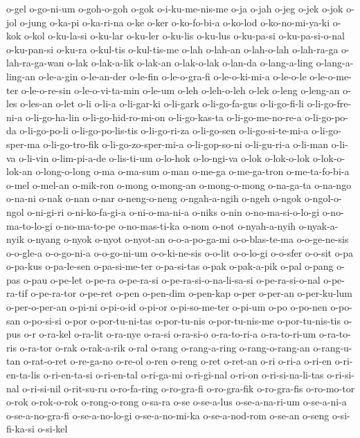 {o-gel o-go-ni-um o-goh-o-goh o-gok o-i-ku-me-nis-me o-ja o-jah o-jeg o-jek
o-jok o-jol o-jung o-ka-pi o-ka-ri-na o-ke o-ker o-ko-fo-bi-a o-ko-lod
o-ko-no-mi-ya-ki o-kok o-kol o-ku-la-si o-ku-lar o-ku-ler o-ku-lis
o-ku-lus o-ku-pa-si o-ku-pa-si-o-nal o-ku-pan-si o-ku-ra o-kul-tis
o-kul-tis-me o-lah o-lah-an o-lah-o-lah o-lah-ra-ga o-lah-ra-ga-wan o-lak
o-lak-a-lik o-lak-an o-lak-o-lak o-lan-da o-lang-a-ling o-lang-a-ling-an
o-le-a-gin o-le-an-der o-le-fin o-le-o-gra-fi o-le-o-ki-mi-a o-le-o-le
o-le-o-me-ter o-le-o-re-sin o-le-o-vi-ta-min o-le-um o-leh o-leh-o-leh
o-lek o-leng o-leng-an o-les o-les-an o-let o-li o-li-a o-li-gar-ki
o-li-gark o-li-go-fa-gus o-li-go-fi-li o-li-go-fre-ni-a o-li-go-ha-lin
o-li-go-hid-ro-mi-on o-li-go-kas-ta o-li-go-me-no-re-a o-li-go-po-da
o-li-go-po-li o-li-go-po-lis-tis o-li-go-ri-za o-li-go-sen
o-li-go-si-te-mi-a o-li-go-sper-ma o-li-go-tro-fik o-li-go-zo-sper-mi-a
o-li-gop-so-ni o-li-gu-ri-a o-li-man o-li-va o-li-vin o-lim-pi-a-de
o-lis-ti-um o-lo-hok o-lo-ngi-va o-lok o-lok-o-lok o-lok-o-lok-an
o-long-o-long o-ma o-ma-sum o-man o-me-ga o-me-ga-tron o-me-ta-fo-bi-a
o-mel o-mel-an o-mik-ron o-mong o-mong-an o-mong-o-mong o-na-ga-ta
o-na-ngo o-na-ni o-nak o-nan o-nar o-neng-o-neng o-ngah-a-ngih o-ngeh
o-ngok o-ngol-o-ngol o-ni-gi-ri o-ni-ko-fa-gi-a o-ni-o-ma-ni-a o-niks
o-nin o-no-ma-si-o-lo-gi o-no-ma-to-lo-gi o-no-ma-to-pe o-no-mas-ti-ka
o-nom o-not o-nyah-a-nyih o-nyak-a-nyik o-nyang o-nyok o-nyot o-nyot-an
o-o-a-po-ga-mi o-o-blas-te-ma o-o-ge-ne-sis o-o-gle-a o-o-go-ni-a
o-o-go-ni-um o-o-ki-ne-sis o-o-lit o-o-lo-gi o-o-sfer o-o-sit o-pa
o-pa-kus o-pa-le-sen o-pa-si-me-ter o-pa-si-tas o-pak o-pak-a-pik o-pal
o-pang o-pas o-pau o-pe-let o-pe-ra o-pe-ra-si o-pe-ra-si-o-na-li-sa-si
o-pe-ra-si-o-nal o-pe-ra-tif o-pe-ra-tor o-pe-ret o-pen o-pen-dim
o-pen-kap o-per o-per-an o-per-ku-lum o-per-o-per-an o-pi-ni o-pi-o-id
o-pi-or o-pi-so-me-ter o-pi-um o-po o-po-nen o-po-san o-po-si-si o-por
o-por-tu-ni-tas o-por-tu-nis o-por-tu-nis-me o-por-tu-nis-tis o-pus o-r
o-ra-kel o-ra-lit o-ra-nye o-ra-si o-ra-si-o o-ra-to-ri-a o-ra-to-ri-um
o-ra-to-ris o-ra-tor o-rak o-rak-a-rik o-ral o-rang o-rang-a-ring
o-rang-o-rang-an o-rang-u-tan o-rat-o-ret o-re-ga-no o-re-ol o-ren o-reng
o-ret o-ret-an o-ri o-ri-a o-ri-en o-ri-en-ta-lis o-ri-en-ta-si
o-ri-en-tal o-ri-ga-mi o-ri-gi-nal o-ri-on o-ri-si-na-li-tas o-ri-si-nal
o-ri-si-nil o-rit-su-ru o-ro-fa-ring o-ro-gra-fi o-ro-gra-fik o-ro-gra-fis
o-ro-mo-tor o-rok o-rok-o-rok o-rong-o-rong o-sa-ra o-se o-se-a-lus
o-se-a-na-ri-um o-se-a-ni-a o-se-a-no-gra-fi o-se-a-no-lo-gi
o-se-a-no-mi-ka o-se-a-nod-rom o-se-an o-seng o-si-fi-ka-si o-si-kel
}
